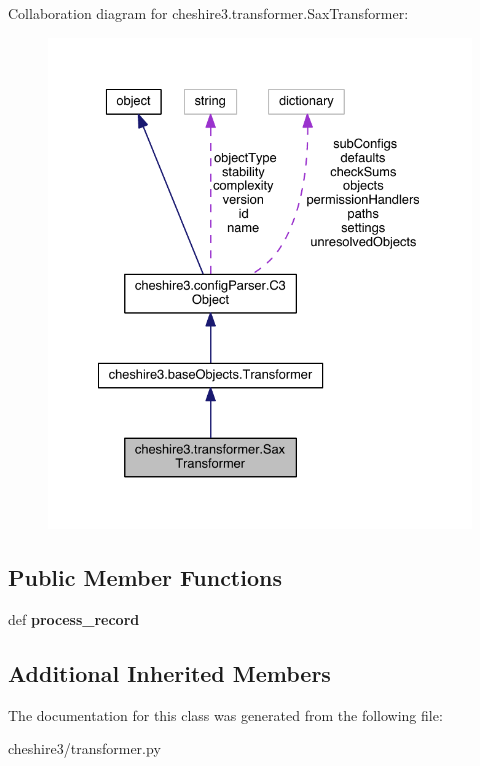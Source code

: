 Collaboration diagram for cheshire3.\-transformer.\-Sax\-Transformer\-:
\nopagebreak
\begin{figure}[H]
\begin{center}
\leavevmode
\includegraphics[width=331pt]{classcheshire3_1_1transformer_1_1_sax_transformer__coll__graph}
\end{center}
\end{figure}
\subsection*{Public Member Functions}
\begin{DoxyCompactItemize}
\item 
\hypertarget{classcheshire3_1_1transformer_1_1_sax_transformer_af0ec0b1bab2a120d15a9bde6978dbc5a}{def {\bfseries process\-\_\-record}}\label{classcheshire3_1_1transformer_1_1_sax_transformer_af0ec0b1bab2a120d15a9bde6978dbc5a}

\end{DoxyCompactItemize}
\subsection*{Additional Inherited Members}


The documentation for this class was generated from the following file\-:\begin{DoxyCompactItemize}
\item 
cheshire3/transformer.\-py\end{DoxyCompactItemize}
